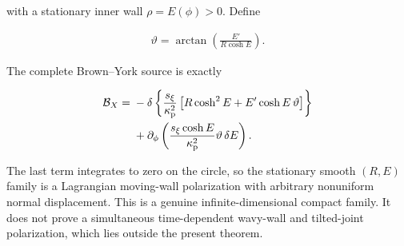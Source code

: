 with a stationary inner wall $\rho=E(\phi)>0$. Define

\begin{align}
\vartheta
=\arctan\left(\frac{E'}{R\cosh E}\right).
\end{align}

The complete Brown--York source is exactly

\[\begin{aligned}
\mathcal B_X
={}&-\delta\left\{
\frac{s_\xi}{\kappa_{\rm p}^{2}}
\left[R\cosh^2E+E'\cosh E\,\vartheta\right]
\right\}\\
&+\partial_\phi\left(
\frac{s_\xi\cosh E}{\kappa_{\rm p}^{2}}
\vartheta\,\delta E
\right). \label{eq:nonuniform-polarization}
\end{aligned}\]

The last term integrates to zero on the circle, so the stationary smooth $(R,E)$ family is a Lagrangian moving-wall polarization with arbitrary nonuniform normal displacement. This is a genuine infinite-dimensional compact family. It does not prove a simultaneous time-dependent wavy-wall and tilted-joint polarization, which lies outside the present theorem.

